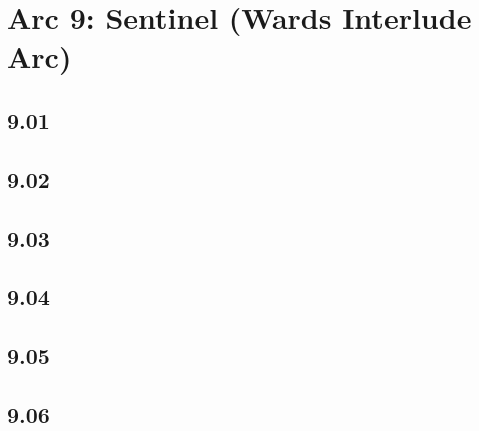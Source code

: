 \part{Arc 9: Sentinel (Wards Interlude Arc)}
 \chapter{9.01}
 \chapter{9.02}
 \chapter{9.03}
 \chapter{9.04}
 \chapter{9.05}
 \chapter{9.06}







